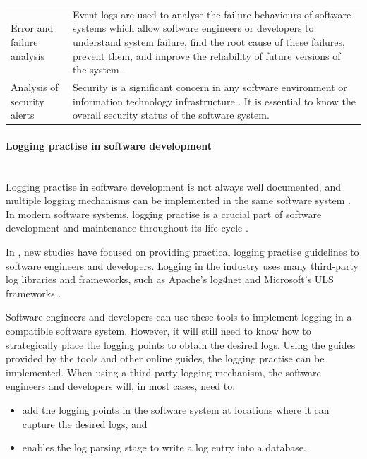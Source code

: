 \begin{xltabular}{\textwidth}{p{4cm}X}
	Error and failure analysis & \RaggedRight Event logs are used to analyse the failure behaviours of software systems which allow software engineers or developers to understand system failure, find the root cause of these failures, prevent them, and improve the reliability of future versions of the system \cite{Cinque2013}.\\


	\RaggedRight Analysis of security alerts & \RaggedRight Security is a significant concern in any software environment or information technology infrastructure \cite{Pathan2014, Dwyer2013}. It is essential to know the overall security status of the software system. \\
	\bottomrule
\end{xltabular}

\paragraph{Logging practise in software development}\label{sec:ch1_loggingPractice}\leavevmode\\
Logging practise in software development is not always well documented, and multiple logging mechanisms can be implemented in the same software system \cite{Pecchia2015, Kitchenham2007}. In modern software systems, logging practise is a crucial part of software development and maintenance throughout its life cycle \cite{Rong2018}.\par In , new studies have focused on providing practical logging practise guidelines to software engineers and developers. Logging in the industry uses many third-party log libraries and frameworks, such as Apache's log4net and Microsoft's ULS frameworks \cite{Zhu2015, Rong2018}.\par Software engineers and developers can use these tools to implement logging in a compatible software system. However, it will still need to know how to strategically place the logging points to obtain the desired logs. Using the guides provided by the tools and other online guides, the logging practise can be implemented. When using a third-party logging mechanism, the software engineers and developers will, in most cases, need to:

\begin{itemize}
	\item add the logging points in the software system at locations where it can capture the desired logs, and
	\item enables the log parsing stage to write a log entry into a database.
\end{itemize}


